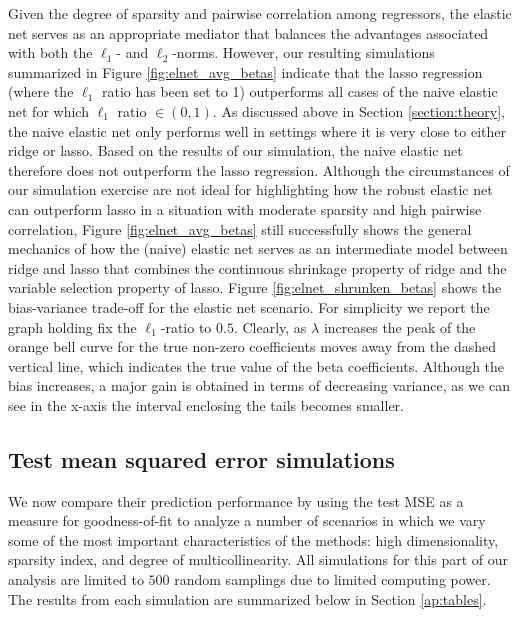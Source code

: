 \noindent Given the degree of sparsity and pairwise correlation among regressors, the elastic net serves as an appropriate mediator that balances the advantages associated with both the $\ell_1$- and $\ell_2$-norms. However, our resulting simulations summarized in Figure \ref{fig:elnet_avg_betas} indicate that the lasso regression (where the $\ell_1$ ratio has been set to 1) outperforms all cases of the naive elastic net for which $\ell_1$ ratio $\in (0,1)$. As discussed above in Section \ref{section:theory}, the naive elastic net only performs well in settings where it is very close to either ridge or lasso. Based on the results of our simulation, the naive elastic net therefore does not outperform the lasso regression. Although the circumstances of our simulation exercise are not ideal for highlighting how the robust elastic net can outperform lasso in a situation with moderate sparsity and high pairwise correlation, Figure \ref{fig:elnet_avg_betas} still successfully shows the general mechanics of how the (naive) elastic net serves as an intermediate model between ridge and lasso that combines the continuous shrinkage property of ridge and the variable selection property of lasso. Figure \ref{fig:elnet_shrunken_betas} shows the bias-variance trade-off for the elastic net scenario. For simplicity we report the graph holding fix the $\ell_1$-ratio to $0.5$. Clearly, as $\lambda$ increases the peak of the orange bell curve for the true non-zero coefficients moves away from the dashed vertical line, which indicates the true value of the beta coefficients. Although the bias increases, a major gain is obtained in terms of decreasing variance, as we can see in the x-axis the interval enclosing the tails becomes smaller.

\subsection{Test mean squared error simulations}
\label{section:msesim}

\noindent We now compare their prediction performance by using the test MSE as a measure for goodness-of-fit to analyze a number of scenarios in which we vary some of the most important characteristics of the methods: high dimensionality, sparsity index, and degree of multicollinearity. All simulations for this part of our analysis are limited to $500$ random samplings due to limited computing power. The results from each simulation are summarized below in Section \ref{ap:tables}. \\ 

